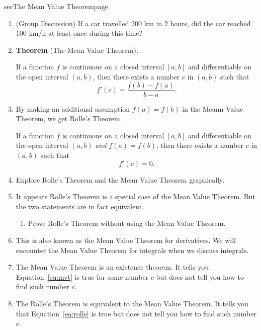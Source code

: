 \documentclass[../main]{subfiles}
\begin{document}
\begin{outline}{sec}{The Mean Value Theorem}{page}\label{outline:mvt}
  \begin{enumerate}
     \item (Group Discussion) If a car travelled \(200\) km in \(2\) hours, did the car reached \(100\) km/h at least once during this time?  
    \item \textbf{Theorem} (The Mean Value Theorem).
      \begin{mdframed}[style=simple]
        If a function \(f\) is continuous on a closed interval \([a,b]\) and differentiable on the open interval \((a,b)\), then there exists a number \(c\) in \((a,b)\) such that
        \begin{equation} \label{eq:mvt}
          f'(c) = \frac{f(b) - f(a)}{b - a}.
        \end{equation}
      \end{mdframed}
         
     \item By making an additional assumption \(f(a) = f(b)\) in the Meann Value Theorem, we get Rolle's Theorem. 
       \begin{mdframed}[style=simple]
         If a function \(f\) is continuous on a closed interval \([a,b]\) and differentiable on the open interval \((a,b)\) \textit{and \(f(a) = f(b)\)}, then there exists a number \(c\) in \((a,b)\) such that
         \begin{equation} \label{eq:rolle}
           f'(c) = 0.
         \end{equation}
       \end{mdframed}
         
     \item Explore Rolle's Theorem and the Mean Value Theorem graphically.
     \item It appears Rolle's Theorem is a special case of the Mean Value Theorem. But the two statements are in fact equivalent.
       \begin{enumerate}
         \item Prove Rolle's Theorem without using the Mean Value Theorem.
       \end{enumerate}
       
     \item This is also known as the Mean Value Theorem for derivatives. We will encounter the Mean Value Theorem for integrals when we discuss integrals.
     \item {The Mean Value Theorem is an existence theorem. It tells you Equation~\eqref{eq:mvt} is true for some number \(c\) but does not tell you how to find such number \(c\).}
     \item {The Rolle's Theorem is equivalent to the Mean Value Theorem. It tells you that Equation~\eqref{eq:rolle} is true but does not tell you how to find such number \(c\).}
  \end{enumerate}
\end{outline}
\end{document}
